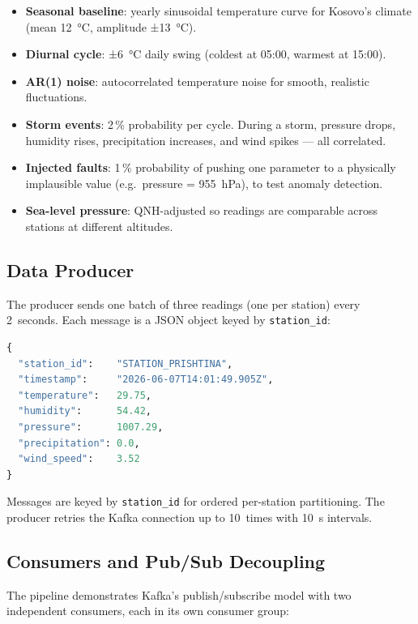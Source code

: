 \documentclass[conference,a4paper]{IEEEtran}
\begin{document}
\begin{itemize}
  \item \textbf{Seasonal baseline}: yearly sinusoidal temperature curve for Kosovo's climate (mean 12~°C, amplitude ±13~°C).
  \item \textbf{Diurnal cycle}: ±6~°C daily swing (coldest at 05:00, warmest at 15:00).
  \item \textbf{AR(1) noise}: autocorrelated temperature noise for smooth, realistic fluctuations.
  \item \textbf{Storm events}: 2\,\% probability per cycle. During a storm, pressure drops, humidity rises, precipitation increases, and wind spikes --- all correlated.
  \item \textbf{Injected faults}: 1\,\% probability of pushing one parameter to a physically implausible value (e.g.\ pressure = 955~hPa), to test anomaly detection.
  \item \textbf{Sea-level pressure}: QNH-adjusted so readings are comparable across stations at different altitudes.
\end{itemize}

\subsection{Data Producer}

The producer sends one batch of three readings (one per station) every 2~seconds. Each message is a JSON object keyed by \texttt{station\_id}:

\begin{lstlisting}[language=Python, caption=Example Kafka message]
{
  "station_id":    "STATION_PRISHTINA",
  "timestamp":     "2026-06-07T14:01:49.905Z",
  "temperature":   29.75,
  "humidity":      54.42,
  "pressure":      1007.29,
  "precipitation": 0.0,
  "wind_speed":    3.52
}
\end{lstlisting}

Messages are keyed by \texttt{station\_id} for ordered per-station partitioning.
The producer retries the Kafka connection up to 10~times with 10~s intervals.

\subsection{Consumers and Pub/Sub Decoupling}

The pipeline demonstrates Kafka's publish/subscribe model with two independent
consumers, each in its own consumer group:
\end{document}
